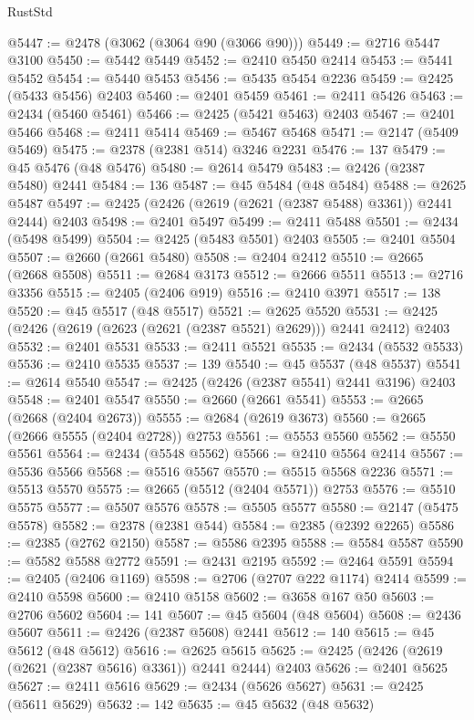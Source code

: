 \begin{lexlean}{RustStd}
\begin{coremodule}
@5447 := @2478 (@3062 (@3064 @90 (@3066 @90)))
@5449 := @2716 @5447 @3100
@5450 := @5442 @5449
@5452 := @2410 @5450 @2414
@5453 := @5441 @5452
@5454 := @5440 @5453
@5456 := @5435 @5454 @2236
@5459 := @2425 (@5433 @5456) @2403
@5460 := @2401 @5459
@5461 := @2411 @5426
@5463 := @2434 (@5460 @5461)
@5466 := @2425 (@5421 @5463) @2403
@5467 := @2401 @5466
@5468 := @2411 @5414
@5469 := @5467 @5468
@5471 := @2147 (@5409 @5469)
@5475 := @2378 (@2381 @514) @3246 @2231
@5476 := 137
@5479 := @45 @5476 (@48 @5476)
@5480 := @2614 @5479
@5483 := @2426 (@2387 @5480) @2441
@5484 := 136
@5487 := @45 @5484 (@48 @5484)
@5488 := @2625 @5487
@5497 := @2425 (@2426 (@2619 (@2621 (@2387 @5488) @3361)) @2441 @2444) @2403
@5498 := @2401 @5497
@5499 := @2411 @5488
@5501 := @2434 (@5498 @5499)
@5504 := @2425 (@5483 @5501) @2403
@5505 := @2401 @5504
@5507 := @2660 (@2661 @5480)
@5508 := @2404 @2412
@5510 := @2665 (@2668 @5508)
@5511 := @2684 @3173
@5512 := @2666 @5511
@5513 := @2716 @3356
@5515 := @2405 (@2406 @919)
@5516 := @2410 @3971
@5517 := 138
@5520 := @45 @5517 (@48 @5517)
@5521 := @2625 @5520
@5531 := @2425 (@2426 (@2619 (@2623 (@2621 (@2387 @5521) @2629))) @2441 @2412) @2403
@5532 := @2401 @5531
@5533 := @2411 @5521
@5535 := @2434 (@5532 @5533)
@5536 := @2410 @5535
@5537 := 139
@5540 := @45 @5537 (@48 @5537)
@5541 := @2614 @5540
@5547 := @2425 (@2426 (@2387 @5541) @2441 @3196) @2403
@5548 := @2401 @5547
@5550 := @2660 (@2661 @5541)
@5553 := @2665 (@2668 (@2404 @2673))
@5555 := @2684 (@2619 @3673)
@5560 := @2665 (@2666 @5555 (@2404 @2728)) @2753
@5561 := @5553 @5560
@5562 := @5550 @5561
@5564 := @2434 (@5548 @5562)
@5566 := @2410 @5564 @2414
@5567 := @5536 @5566
@5568 := @5516 @5567
@5570 := @5515 @5568 @2236
@5571 := @5513 @5570
@5575 := @2665 (@5512 (@2404 @5571)) @2753
@5576 := @5510 @5575
@5577 := @5507 @5576
@5578 := @5505 @5577
@5580 := @2147 (@5475 @5578)
@5582 := @2378 (@2381 @544)
@5584 := @2385 (@2392 @2265)
@5586 := @2385 (@2762 @2150)
@5587 := @5586 @2395
@5588 := @5584 @5587
@5590 := @5582 @5588 @2772
@5591 := @2431 @2195
@5592 := @2464 @5591
@5594 := @2405 (@2406 @1169)
@5598 := @2706 (@2707 @222 @1174) @2414
@5599 := @2410 @5598
@5600 := @2410 @5158
@5602 := @3658 @167 @50
@5603 := @2706 @5602
@5604 := 141
@5607 := @45 @5604 (@48 @5604)
@5608 := @2436 @5607
@5611 := @2426 (@2387 @5608) @2441
@5612 := 140
@5615 := @45 @5612 (@48 @5612)
@5616 := @2625 @5615
@5625 := @2425 (@2426 (@2619 (@2621 (@2387 @5616) @3361)) @2441 @2444) @2403
@5626 := @2401 @5625
@5627 := @2411 @5616
@5629 := @2434 (@5626 @5627)
@5631 := @2425 (@5611 @5629)
@5632 := 142
@5635 := @45 @5632 (@48 @5632)

\end{coremodule}
\end{lexlean}
